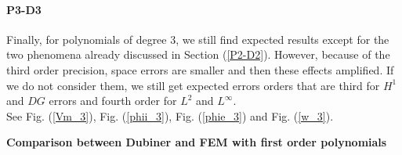\documentclass[a4paper,11pt]{article}
\begin{document}
\paragraph{P3-D3}
\noindent Finally, for polynomials of degree 3, we still find expected results except for the two phenomena already discussed in Section (\ref{P2-D2}). However, because of the third order precision, space errors are smaller and then these effects amplified. If we do not consider them, we still get expected errors orders that are third for $H^1$ and $DG$ errors and fourth order for $L^2$ and $L^\infty$.\\
\noindent See Fig. (\ref{Vm_3}), Fig. (\ref{phii_3}), Fig. (\ref{phie_3}) and Fig. (\ref{w_3}). 
\newpage
{}
\begin{center}
\textbf{Comparison between Dubiner and FEM with first order polynomials}
\end{center}
\end{document}
